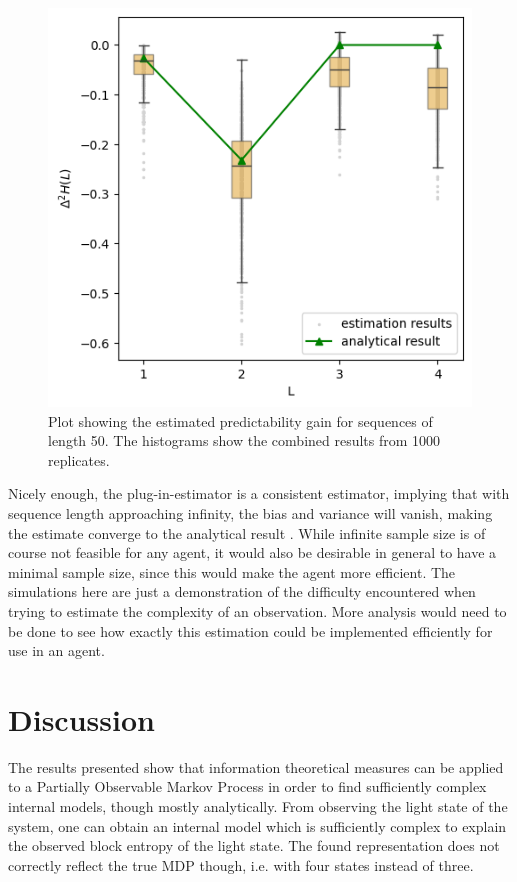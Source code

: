 \documentclass[12pt,a4paper]{article}
\begin{document}
\begin{figure}[H]
    \centering
    \includegraphics[width=0.6\linewidth]{../figures/predictability_gain_thesis.png}
    \caption{\label{fig:pred_gain} Plot showing the estimated predictability gain for sequences of length 50. The histograms show the combined results from 1000 replicates.}
\end{figure}

Nicely enough, the plug-in-estimator is a consistent estimator, implying that with sequence length approaching infinity, the bias and variance will vanish, making the estimate converge to the analytical result \autocite{basharin1959plugin}.
While infinite sample size is of course not feasible for any agent, it would also be desirable in general to have a minimal sample size, since this would make the agent more efficient.
The simulations here are just a demonstration of the difficulty encountered when trying to estimate the complexity of an observation.
More analysis would need to be done to see how exactly this estimation could be implemented efficiently for use in an agent.


\newpage
\section{Discussion} \label{sec:discussion}
The results presented show that information theoretical measures can be applied to a Partially Observable Markov Process in order to find sufficiently complex internal models, though mostly analytically.
From observing the light state of the system, one can obtain an internal model which is sufficiently complex to explain the observed block entropy of the light state.
The found representation does not correctly reflect the true MDP though, i.e. with four states instead of three.
\end{document}
